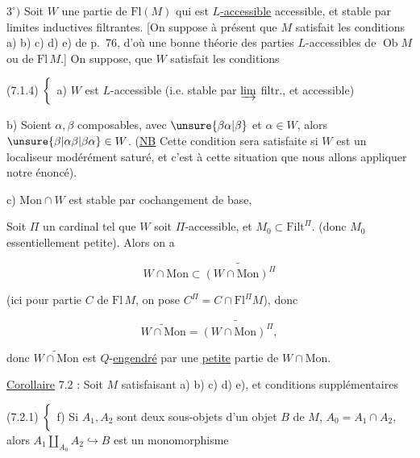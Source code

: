 $3^\circ)$ Soit $W$ une partie de $\mathrm{Fl}(M)$ qui est \uline{$L$-accessible}  accessible, et stable par limites inductives filtrantes. [On suppose à présent que $M$ satisfait les conditions a) b) c) d) e) de p.~76, d'où une bonne théorie des parties $L$-accessibles de $\operatorname{Ob}M$ ou de $\mathrm{Fl}\,M$.] On suppose,   que $W$ satisfait les conditions


(7.1.4) $\left\{\vphantom{\dfrac{A}{A}}\right.$ a) $W$ est $L$-accessible (i.e. stable par $\varinjlim$ filtr., et accessible)

b) Soient $\alpha,\beta$ composables, avec $\unsure{\beta\alpha|\beta}$ et $\alpha\in W$, alors $\unsure{\beta|\alpha\beta|\beta\alpha}\in W$. (\uline{NB} Cette condition sera satisfaite si $W$ est un localiseur modérément saturé, et c'est à cette situation que nous allons appliquer notre énoncé).

c) $\mathrm{Mon}\cap W$ est stable par cochangement de base,


Soit $\Pi$ un cardinal tel que $W$ soit $\Pi$-accessible, et $M_0\subset\mathrm{Filt}^{\Pi}$. (donc $M_0$ essentiellement petite). Alors on a

\[
W\cap\mathrm{Mon}\subset\widetilde{(W\cap\mathrm{Mon})^\Pi}\tag*{(7.1.6)}
\]

(ici pour  partie $C$ de $\mathrm{Fl}\,M$, on pose $C^\Pi=C\cap\mathrm{Fl}^{\Pi}M$), donc

\[
\widetilde{W\cap\mathrm{Mon}}=\widetilde{(W\cap\mathrm{Mon})^\Pi},\tag*{(7.1.7)}
\]

donc $\widetilde{W\cap\mathrm{Mon}}$ est $Q$-\uline{engendré} par une \uline{petite} partie de $W\cap\mathrm{Mon}$.

\uline{Corollaire} 7.2 : Soit $M$ satisfaisant a) b) c) d) e), et  conditions supplémentaires 

(7.2.1) $\left\{\vphantom{\dfrac{A}{A}}\right.$  f) Si $A_1,A_2$ sont deux sous-objets d'un objet $B$ de $M$,  $A_0=A_1\cap A_2$, alors $A_1\amalg_{A_0} A_2\hookrightarrow B$ est un monomorphisme

